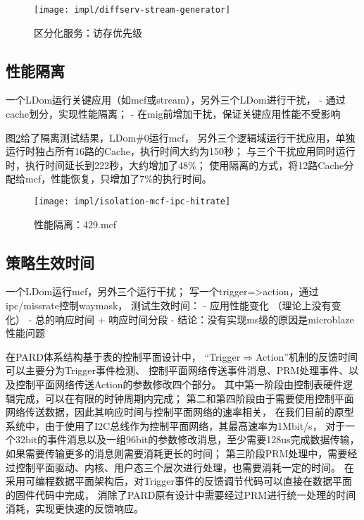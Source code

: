 \begin{figure}[htb]
  \centering
  \texttt{[image: impl/diffserv-stream-generator]}
  \caption{区分化服务：访存优先级}
  \label{fig:diffserv-stream-generator}
\end{figure}

\subsection{性能隔离}

一个LDom运行关键应用（如mcf或stream），另外三个LDom进行干扰，
 - 通过cache划分，实现性能隔离；
 - 在mig前增加干扰，保证关键应用性能不受影响

图\ref{fig:isolation-mcf-ipc-hitrate}给了隔离测试结果，LDom\#0运行mcf，
另外三个逻辑域运行干扰应用，单独运行时独占所有16路的Cache，执行时间大约为150秒；
与三个干扰应用同时运行时，执行时间延长到222秒，大约增加了48\%；
使用隔离的方式，将12路Cache分配给mcf，性能恢复，只增加了7\%的执行时间。

\begin{figure}[tb]
  \centering
  \texttt{[image: impl/isolation-mcf-ipc-hitrate]}
  \caption{性能隔离：429.mcf}
  \label{fig:isolation-mcf-ipc-hitrate}
\end{figure}


\subsection{策略生效时间}
\label{chap:impl:trigger-latency}

一个LDom运行mcf，另外三个运行干扰；
写一个trigger=>action，通过ipc/missrate控制waymask，
测试生效时间：
 - 应用性能变化 （理论上没有变化）
 - 总的响应时间 + 响应时间分段
 - 结论：没有实现ms级的原因是microblaze性能问题

在PARD体系结构基于表的控制平面设计中，
``Trigger$\Rightarrow$Action''机制的反馈时间可以主要分为Trigger事件检测、
控制平面网络传送事件消息、PRM处理事件、以及控制平面网络传送Action的参数修改四个部分。
其中第一阶段由控制表硬件逻辑完成，可以在有限的时钟周期内完成；
第二和第四阶段由于需要使用控制平面网络传送数据，因此其响应时间与控制平面网络的速率相关，
在我们目前的原型系统中，由于使用了I2C总线作为控制平面网络，其最高速率为1Mbit/s，
对于一个32bit的事件消息以及一组96bit的参数修改消息，至少需要128us完成数据传输，
如果需要传输更多的消息则需要消耗更长的时间；
第三阶段PRM处理中，需要经过控制平面驱动、内核、用户态三个层次进行处理，也需要消耗一定的时间。
在采用可编程数据平面架构后，对Trigger事件的反馈调节代码可以直接在数据平面的固件代码中完成，
消除了PARD原有设计中需要经过PRM进行统一处理的时间消耗，实现更快速的反馈响应。

